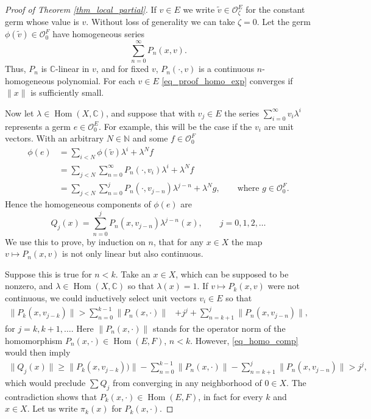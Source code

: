 \documentclass{amsart}
\numberwithin{equation}{section}
\theoremstyle{definition}
\theoremstyle{plain}
\theoremstyle{remark}
\begin{document}
\begin{proof}[Proof of Theorem \ref{thm_local_partial}]
If $v\in E$ we write $\tilde v\in{\ensuremath{\mathcal{{O}}}}^{E}_\zeta$ for the constant germ
whose value is $v$. Without loss of generality we can take $\zeta=0$.
Let the germ $\phi(\tilde v)\in{\ensuremath{\mathcal{{O}}}}^F_0$ have homogeneous series
\begin{equation} \label{eq_proof_homo_exp}
	\sum_{n=0}^\infty P_n(x,v).
\end{equation}
Thus, $P_n$ is $\mathbb{C}$-linear in $v$, and for fixed $v$, $P_n(\cdot,v)$
is a continuous $n$-homogeneous polynomial. For each 
$v\in E$ \eqref{eq_proof_homo_exp} converges if $\|x\|$ is sufficiently small.

Now let $\lambda\in {{\mathop{\mathrm{Hom}}}}(X,\mathbb{C})$, and suppose that with 
$v_j\in E$ the series $\sum_{i=0}^\infty v_i\lambda^i$ represents
a germ $e\in{\ensuremath{\mathcal{{O}}}}^{E}_0$.
For example, this will be the case if the $v_i$ are unit vectors. 
With an arbitrary $N\in\mathbb{N}$ and some $f\in{\ensuremath{\mathcal{{O}}}}^F_0$
\begin{align*}
	\phi(e)	&=\sum_{i<N} \phi(\tilde v)\lambda^i+\lambda^N f\\
		&=\sum_{j<N} \sum_{n=0}^\infty 
			P_n(\cdot,v_i)\lambda^i+\lambda^Nf\\
		&=\sum_{j<N}\sum_{n=0}^j P_n(\cdot,v_{j-n})\lambda^{j-n}
			+\lambda^Ng, \qquad\text{where }g\in{\ensuremath{\mathcal{{O}}}}^{F}_0.
\end{align*}
Hence the homogeneous components of $\phi(e)$ are 
\begin{equation}\label{eq_homo_comp}
Q_j(x)=\sum_{n=0}^j P_n(x,v_{j-n})\lambda^{j-n}(x), \qquad j=0,1,2,\ldots
\end{equation}
We use this to prove, by induction on $n$, that for any $x\in X$ the map
$v\mapsto P_n(x,v)$ is not only linear but also continuous.

Suppose this is true for $n<k$. Take an $x\in X$, which can be supposed to be
nonzero, and $\lambda\in{{\mathop{\mathrm{Hom}}}}(X,\mathbb{C})$ so that $\lambda(x)=1$.
If $v\mapsto P_k(x,v)$ were not continuous, we could inductively select
unit vectors $v_i\in E$ so that
\[
	\begin{split}
	\|P_k(x,v_{j-k})\| > 
		\sum_{n=0}^{k-1}
		\|P_n(x,\cdot)\| & +j^j
		+\sum_{n=k+1}^j \|P_n(x,v_{j-n})\| ,
	\end{split}
\]
for $j=k,k+1,\ldots$. Here $\|P_n(x,\cdot)\|$ stands for the operator
norm of the homomorphism $P_n(x,\cdot)\in {{\mathop{\mathrm{Hom}}}}(E,F)$, $n<k$.
However, \eqref{eq_homo_comp} would then imply
\[
\begin{split}
\|Q_j(x)\|\geq 
	\|P_k(x,v_{j-k}) )\| 
	-\sum_{n=0}^{k-1}\|P_n(x,\cdot)\| 
	-\sum_{n=k+1}^j \|P_n(x,v_{j-n})\|  
	>j^j,
\end{split}
\]
which would preclude $\sum Q_j$ from converging in any neighborhood of $0\in X$.
The contradiction shows that $P_k(x,\cdot)\in{{\mathop{\mathrm{Hom}}}}(E,F)$, in fact for every
$k$ and $x\in X$.
Let us write $\pi_k(x)$ for $P_k(x,\cdot)$.


\end{proof}
\end{document}
